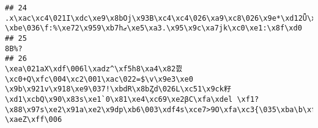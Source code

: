 \documentclass[
]{article}
\begin{document}
\begin{verbatim}
## 24                                                                                                                                                                                                                                                                                                                                                                                                                                                                                                                                                        .x\xac\xc4\021I\xdc\xe9\x8bOj\x93B\xc4\xc4\026\xa9\xc8\026\x9e*\xd12Ǖ\x94dZ\xec\x80\026\xb9\xeds\xa7\t\xa9\003\xcei\xda\xcb\xd04\xd6\xe0}0o\035z\x96Wey+\xf1\xc0\xe8k\xac/\xe3\xc9PL\x8e\xab\x9e\xff״\016fࣗ\xdd1f`\xad\xbe\xc4\xe8\xac\001ί\xd4O֤@\xa1\xe1\xe2\t\x8c\xf5\034\xa8-\xbe\036\f:%\xe72\x959\xb7hޒ\xe5\xa3.\x95\x9c\xa7jk\xc0\xe1:\x8f\xd0
## 25                                                                                                                                                                                                                                                                                                                                                                                                                                                                                                                                                                                                                                                                                                                                                                                                                                                                                                       8B%?
## 26                                                                                                                                                                                                                                                                                                                                                                                                                                       \xea\021aX\xdf\006l\xadz^\xf5h8\xa4\x82쯼\xc0+Q\xfc\004\xc2\001\xac\022=$\v\x9e3\xe0 \x9b\x921v\x918\xe9\037!\xbdR\x8bȤd\026L\xc51\x9ck籽\xd1\xcbQ\x90\x83s\xe1`0\x81\xe4\xc69\xe2βC\xfa\xdel \xf1?\x88\x97s\xe2\x91a\xe2\x9dp\xb6\003\xdf4s\xce7>9O\xfa\xc3{\035\xba\b\xfe\x98\033\xa7\xe8\x9b\xf5\xaf\xf4\034w\xe1\036\030\xdf\xd7y^T\xdb\026\022\xd6\xf9\aN\xeb>\025\xd4c\xdedr\x83ɺ\005\xbf\xc7\xfa]\xf3wc8\x83\x97\xe9\xd6\xf5\xf2vQ^\x97\xf9_g5%?\xaeZ\xff\006

\end{verbatim}
\end{document}
